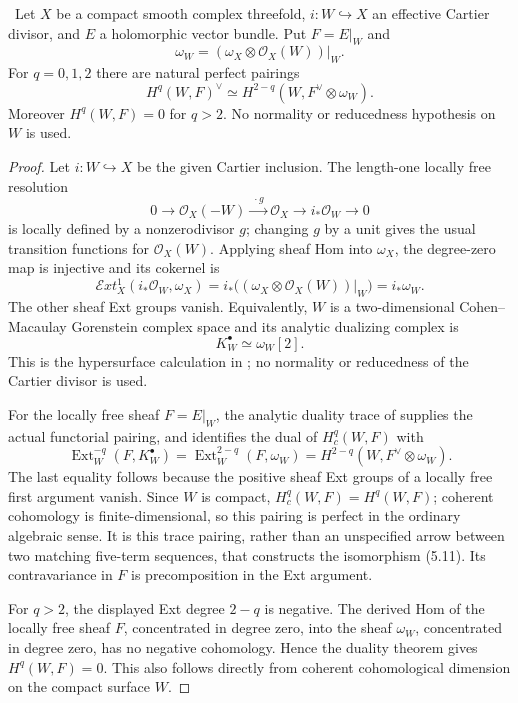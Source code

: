 \begin{theorem}
\label{thm:cartier-duality}
\Verified\ Let $X$ be a compact smooth complex threefold,
$i:W\hookrightarrow X$ an effective Cartier divisor, and $E$ a holomorphic
vector bundle.  Put $F=E|_W$ and
\[
\omega_W=(\omega_X\otimes\mathcal O_X(W))|_W.
\]
For $q=0,1,2$ there are natural perfect pairings
\[
H^q(W,F)^\vee
\simeq H^{2-q}(W,F^\vee\otimes\omega_W).
\tag{5.11}
\]
Moreover $H^q(W,F)=0$ for $q>2$.  No normality or reducedness hypothesis on
$W$ is used.
\end{theorem}

\begin{proof}
Let \(i:W\hookrightarrow X\) be the given Cartier inclusion.  The
length-one locally free resolution
\[
 0\longrightarrow\mathcal O_X(-W)
 \xrightarrow{\;\cdot g\;}\mathcal O_X
 \longrightarrow i_*\mathcal O_W\longrightarrow0
\]
is locally defined by a nonzerodivisor \(g\); changing \(g\) by a unit
gives the usual transition functions for \(\mathcal O_X(W)\).
Applying sheaf Hom into \(\omega_X\), the degree-zero map is
injective and its cokernel is
\[
 \mathcal E xt^1_X(i_*\mathcal O_W,\omega_X)
 =i_*\bigl((\omega_X\otimes\mathcal O_X(W))|_W\bigr)
 =i_*\omega_W.
\]
The other sheaf Ext groups vanish.  Equivalently, \(W\) is a
two-dimensional Cohen--Macaulay Gorenstein complex space and its
analytic dualizing complex is
\[
 K_W^\bullet\simeq\omega_W[2].
\]
This is the hypersurface calculation in
\cite[Proposition~2 and pp.~90--91]{RamisRuget1970}; no normality or
reducedness of the Cartier divisor is used.

For the locally free sheaf \(F=E|_W\), the analytic duality trace of
\cite[Theorem~2, pp.~82--83]{RamisRuget1970} supplies the actual
functorial pairing, and identifies the dual of \(H_c^q(W,F)\) with
\[
 \operatorname{Ext}^{-q}_W(F,K_W^\bullet)
 =\operatorname{Ext}^{2-q}_W(F,\omega_W)
 =H^{2-q}(W,F^\vee\otimes\omega_W).
\]
The last equality follows because the positive sheaf Ext groups
of a locally free first argument vanish.  Since \(W\) is compact,
\(H_c^q(W,F)=H^q(W,F)\); coherent cohomology is finite-dimensional,
so this pairing is perfect in the ordinary algebraic sense.
It is this trace pairing, rather than an unspecified arrow between
two matching five-term sequences, that constructs the isomorphism
(5.11).  Its contravariance in \(F\) is precomposition in the Ext
argument.

For \(q>2\), the displayed Ext degree \(2-q\) is negative.  The
derived Hom of the locally free sheaf \(F\), concentrated in degree
zero, into the sheaf \(\omega_W\), concentrated in degree zero, has
no negative cohomology.  Hence the duality theorem gives
\(H^q(W,F)=0\).  This also follows directly from coherent
cohomological dimension on the compact surface \(W\).
\end{proof}


